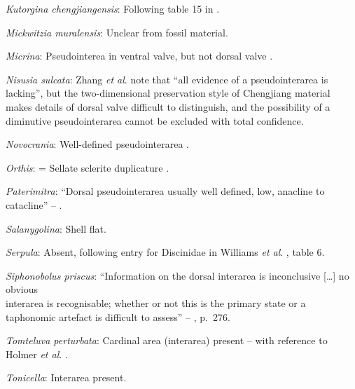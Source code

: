 \documentclass[openany]{book}
\theoremstyle{definition}
\theoremstyle{definition}
\theoremstyle{definition}
\theoremstyle{remark}
\begin{document}
\hypertarget{Kutorgina_chengjiangensis-coding-85}{}
\emph{Kutorgina chengjiangensis}: Following table 15 in
\citet{Williams2000LinguliformeaCraniiformea}.

\hypertarget{Mickwitzia_muralensis-coding-85}{}
\emph{Mickwitzia muralensis}: Unclear from fossil material.

\hypertarget{Micrina-coding-85}{}
\emph{Micrina}: Pseudointerea in ventral valve, but not dorsal valve
\citep[2007]{Williams2000LinguliformeaCraniiformea}.

\hypertarget{Nisusia_sulcata-coding-85}{}
\emph{Nisusia sulcata}: Zhang \emph{et al}.
\citeyearpar{Zhang2011Theexceptionally} note that ``all evidence of a
pseudointerarea is lacking'', but the two-dimensional preservation style
of Chengjiang material makes details of dorsal valve difficult to
distinguish, and the possibility of a diminutive pseudointerarea cannot
be excluded with total confidence.

\hypertarget{Novocrania-coding-85}{}
\emph{Novocrania}: Well-defined pseudointerarea
\citep[p153]{Williams2000LinguliformeaCraniiformea}.

\hypertarget{Orthis-coding-85}{}
\emph{Orthis}: = Sellate sclerite duplicature
\citep{Holmer2008TheEarly}.

\hypertarget{Paterimitra-coding-85}{}
\emph{Paterimitra}: ``Dorsal pseudointerarea usually well defined, low,
anacline to catacline'' --
\citet{Williams2000LinguliformeaCraniiformea}.

\hypertarget{Salanygolina-coding-85}{}
\emph{Salanygolina}: Shell flat.

\hypertarget{Serpula-coding-85}{}
\emph{Serpula}: Absent, following entry for Discinidae in Williams
\emph{et al}. \citeyearpar{Williams2000LinguliformeaCraniiformea}, table
6.

\hypertarget{Siphonobolus_priscus-coding-85}{}
\emph{Siphonobolus priscus}: ``Information on the dorsal interarea is
inconclusive {[}\ldots{}{]} no obvious\\
interarea is recognisable; whether or not this is the primary state or a
taphonomic artefact is difficult to assess'' --
\citet{Balthasar2008iMummpikia}, p.~276.

\hypertarget{Tomteluva_perturbata-coding-85}{}
\emph{Tomteluva perturbata}: Cardinal area (interarea) present -- with
reference to Holmer \emph{et al}.
\citeyearpar{Holmer2018Evolutionarysignificance}.

\hypertarget{Tonicella-coding-85}{}
\emph{Tonicella}: Interarea present.
\end{document}
